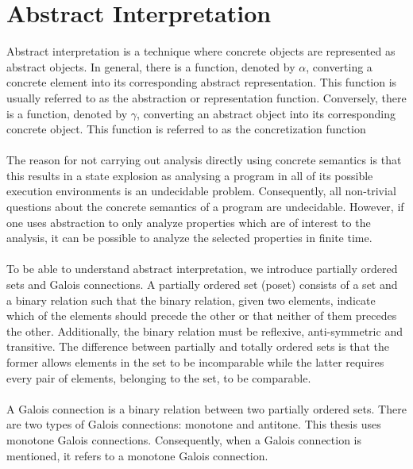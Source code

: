 \documentclass{kththesis}
\newcommand{\fbcomment}[1]{{#1}}
\renewcommand{\fbcomment}[1]{}
\begin{document}
\section{Abstract Interpretation}\label{sec:AbsInt}
\fbcomment{\color{red}Goal: Give the reader a basic understanding of abstract interpretation.}
Abstract interpretation is a technique where concrete objects are represented as abstract objects. In general, there is a function, denoted by $\alpha$, converting a concrete element into its corresponding abstract representation. This function is usually referred to as the abstraction or representation function. Conversely, there is a function, denoted by $\gamma$, converting an abstract object into its corresponding concrete object. This function is referred to as the concretization function
\\ \\%
The reason for not carrying out analysis directly using concrete semantics is that this results in a state explosion as analysing a program in all of its possible execution environments is an undecidable problem\parencite{FRPatrick}. Consequently, all non-trivial questions about the concrete semantics of a program are undecidable. However, if one uses abstraction to only analyze properties which are of interest to the analysis, it can be possible to analyze the selected properties in finite time.
\\ \\
To be able to understand abstract interpretation, we introduce partially ordered sets\parencite{EoMPoset} and Galois connections\cite{galoisConnections}. A partially ordered set (poset) consists of a set and a binary relation such that the binary relation, given two elements, indicate which of the elements should precede the other or that neither of them precedes the other. Additionally, the binary relation must be reflexive, anti-symmetric and transitive. The difference between partially and totally ordered sets is that the former allows elements in the set to be incomparable while the latter requires every pair of elements, belonging to the set, to be comparable.
\\ \\
A Galois connection is a binary relation between two partially ordered sets. There are two types of Galois connections: monotone and antitone. This thesis uses monotone Galois connections. Consequently, when a Galois connection is mentioned, it refers to a monotone Galois connection.
\end{document}
